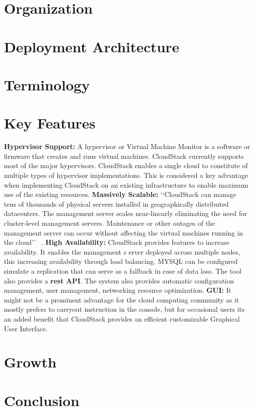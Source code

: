 \section{Organization}

\section{Deployment Architecture}

\section{Terminology}

\section{Key Features}
{\bf Hypervisor Support: } A hypervisor or Virtual Machine Monitor is a software or firmware that creates 
and runs virtual machines. CloudStack currently supports most of the major hypervisors.  CloudStack enables 
a single cloud to constitute of multiple types of hypervisor implementations. This is considered a key 
advantage when implementing CloudStack on an existing infrastructure to enable maximum use of the existing 
resources. {\bf Massively Scalable:} ‘‘CloudStack can manage tens of thousands of physical servers installed
in geographically distributed datacenters. The management server scales near-linearly eliminating the need for
cluster-level management servers. Maintenance or other outages of the management server can occur without
affecting the virtual machines running in the cloud’’ ~\cite{hid-sp18-417-www-cloudstack-scalability}. 
{\bf High Availability:} CloudStack provides features to increase availability. It enables the management s
erver deployed across multiple nodes, this increasing availability through load balancing. MYSQL can be configured
simulate a replication that can serve as a fallback in case of data loss. The tool also provides a {\bf rest API}.
The system also provides automatic configuration management, user management, networking resource optimization. 
{\bf GUI: } It might not be a prominent advantage for the cloud computing community as it mostly prefers to carryout 
instruction in the console, but for occasional users its an added benefit that CloudStack provides an efficient 
customizable Graphical User Interface.

\section{Growth}

\section{Conclusion}


 
